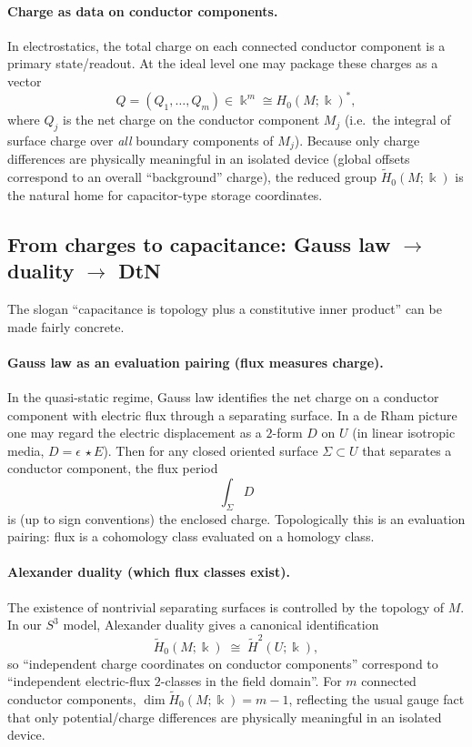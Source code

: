 \documentclass[11pt]{article}
\begin{document}
\paragraph{Charge as data on conductor components.}
In electrostatics, the total charge on each connected conductor component is a primary state/readout.
At the ideal level one may package these charges as a vector
\[
Q=(Q_1,\dots,Q_m)\in \Bbbk^m\cong H_0(M;\Bbbk)^\ast,
\]
where $Q_j$ is the net charge on the conductor component $M_j$ (i.e.\ the integral of surface charge over \emph{all} boundary components of $M_j$).
Because only charge differences are physically meaningful in an isolated device (global offsets correspond to an overall ``background'' charge), the reduced group $\widetilde H_0(M;\Bbbk)$ is the natural home for capacitor-type storage coordinates.

\subsection{From charges to capacitance: Gauss law \texorpdfstring{$\to$}{->} duality \texorpdfstring{$\to$}{->} DtN}
\label{sec:charges-to-capacitance}
The slogan ``capacitance is topology plus a constitutive inner product'' can be made fairly concrete.

\paragraph{Gauss law as an evaluation pairing (flux measures charge).}
In the quasi-static regime, Gauss law identifies the net charge on a conductor component with electric flux through a separating surface.
In a de Rham picture one may regard the electric displacement as a $2$-form $D$ on $U$ (in linear isotropic media, $D=\epsilon\,\star E$).
Then for any closed oriented surface $\Sigma\subset U$ that separates a conductor component, the flux period
\[
\int_{\Sigma} D
\]
is (up to sign conventions) the enclosed charge.
Topologically this is an evaluation pairing: flux is a cohomology class evaluated on a homology class.

\paragraph{Alexander duality (which flux classes exist).}
The existence of nontrivial separating surfaces is controlled by the topology of $M$.
In our $S^3$ model, Alexander duality gives a canonical identification
\[
\widetilde H_0(M;\Bbbk)\;\cong\; \widetilde H^{2}(U;\Bbbk),
\]
so ``independent charge coordinates on conductor components'' correspond to ``independent electric-flux $2$-classes in the field domain''.
For $m$ connected conductor components, $\dim \widetilde H_0(M;\Bbbk)=m-1$, reflecting the usual gauge fact that only potential/charge differences are physically meaningful in an isolated device.
\end{document}
